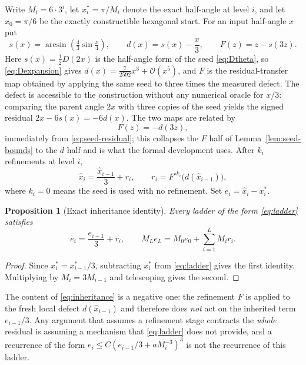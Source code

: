 \documentclass[12pt]{article}
\newtheorem{proposition}[theorem]{Proposition}
\theoremstyle{definition}
\theoremstyle{remark}
\newcommand{\Order}{\mathcal{O}}
\begin{document}
Write $M_i=6\cdot3^i$, let $x_i^\ast=\pi/M_i$ denote the exact half-angle at
level $i$, and let $\widehat x_0=\pi/6$ be the exactly constructible hexagonal
start.  For an input half-angle $x$ put
\begin{equation}
  s(x)=\arcsin\!\left(\tfrac43\sin\tfrac x4\right),
  \qquad
  d(x)=s(x)-\frac x3,
  \qquad
  F(z)=z-s(3z).
  \label{eq:seed-residual}
\end{equation}
Here $s(x)=\tfrac12 D(2x)$ is the half-angle form of the seed
\eqref{eq:Dtheta}, so \eqref{eq:Dexpansion} gives
$d(x)=\tfrac{7}{2592}x^3+\Order(x^5)$, and $F$ is the residual-transfer map
obtained by applying the same seed to three times the measured defect.  The
defect is accessible to the construction without any numerical oracle for
$x/3$: comparing the parent angle $2x$ with three copies of the seed yields the
signed residual $2x-6s(x)=-6d(x)$.  The two maps are related by
\begin{equation}
  F(z)=-d(3z),
  \label{eq:F-identity}
\end{equation}
immediately from \eqref{eq:seed-residual}; this collapses the $F$ half of
Lemma~\ref{lem:seed-bounds} to the $d$ half and is what the formal development
uses.  After $k_i$ refinements at level $i$,
\begin{equation}
  \widehat x_i=\frac{\widehat x_{i-1}}{3}+r_i,
  \qquad
  r_i=F^{\circ k_i}\!\bigl(d(\widehat x_{i-1})\bigr),
  \label{eq:ladder}
\end{equation}
where $k_i=0$ means the seed is used with no refinement.  Set
$e_i=\widehat x_i-x_i^\ast$.

\begin{proposition}[Exact inheritance identity]
\label{prop:inheritance}
Every ladder of the form \eqref{eq:ladder} satisfies
\begin{equation}
  e_i=\frac{e_{i-1}}{3}+r_i,
  \qquad
  M_Le_L=M_0e_0+\sum_{i=1}^{L}M_ir_i.
  \label{eq:inheritance}
\end{equation}
\end{proposition}

\begin{proof}
Since $x_i^\ast=x_{i-1}^\ast/3$, subtracting $x_i^\ast$ from \eqref{eq:ladder}
gives the first identity.  Multiplying by $M_i=3M_{i-1}$ and telescoping gives
the second.
\end{proof}

The content of \eqref{eq:inheritance} is a negative one: the refinement $F$ is
applied to the fresh local defect $d(\widehat x_{i-1})$ and therefore does
\emph{not} act on the inherited term $e_{i-1}/3$.  Any argument that assumes a
refinement stage contracts the \emph{whole} residual is assuming a mechanism
that \eqref{eq:ladder} does not provide, and a recurrence of the form
$e_i\le C(e_{i-1}/3+aM_i^{-3})^3$ is not the recurrence of this ladder.
\end{document}
